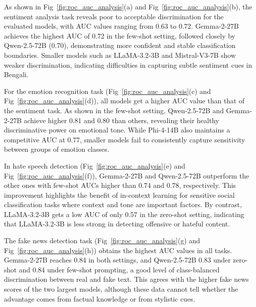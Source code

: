 \documentclass[10pt,letterpaper]{article}
\begin{document}
As shown in Fig~\ref{fig:roc_auc_analysis}(a) and Fig~\ref{fig:roc_auc_analysis}(b), the sentiment analysis task reveals poor to acceptable discrimination for the evaluated models, with AUC values ranging from 0.63 to 0.72. Gemma-2-27B achieves the highest AUC of 0.72 in the few-shot setting, followed closely by Qwen-2.5-72B (0.70), demonstrating more confident and stable classification boundaries. Smaller models such as LLaMA-3.2-3B and Mistral-V3-7B show weaker discrimination, indicating difficulties in capturing subtle sentiment cues in Bengali.

For the emotion recognition task (Fig~\ref{fig:roc_auc_analysis}(c) and Fig~\ref{fig:roc_auc_analysis}(d)), all models get a higher AUC value than that of the sentiment task. As shown in the few-shot setting, Qwen-2.5-72B and Gemma-2-27B achieve higher 0.81 and 0.80 than others, revealing their healthy discriminative power on emotional tone. While Phi-4-14B also maintains a competitive AUC at 0.77, smaller models fail to consistently capture sensitivity between groups of emotion classes.

In hate speech detection (Fig~\ref{fig:roc_auc_analysis}(e) and Fig~\ref{fig:roc_auc_analysis}(f)), Gemma-2-27B and Qwen-2.5-72B outperform the other ones with few-shot AUCs higher than 0.74 and 0.78, respectively. This improvement highlights the benefit of in-context learning for sensitive social classification tasks where context and tone are important factors. By contrast, LLaMA-3.2-3B gets a low AUC of only 0.57 in the zero-shot setting, indicating that LLaMA-3.2-3B is less strong in detecting offensive or hateful content.

The fake news detection task (Fig~\ref{fig:roc_auc_analysis}(g) and Fig~\ref{fig:roc_auc_analysis}(h)) obtains the highest AUC values in all tasks. Gemma-2-27B reaches 0.84 in both settings, and Qwen-2.5-72B 0.83 under zero-shot and 0.84 under few-shot prompting, a good level of class-balanced discrimination between real and fake text. This agrees with the higher fake news scores of the two largest models, although these data cannot tell whether the advantage comes from factual knowledge or from stylistic cues.
\end{document}
